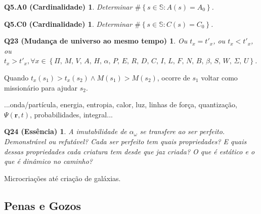 \documentclass[12pt,a4paper]{article}
\begin{document}
			\newtheorem{Q5.A0}{Q5.A0 (Cardinalidade)}
			\begin{Q5.A0} Determinar $ \#\left\{s \in \mathbb{S} : A(s) = A_0 \right\}$.
			\end{Q5.A0}

			\newtheorem{Q5.C0}{Q5.C0 (Cardinalidade)}
			\begin{Q5.C0} Determinar $ \#\left\{s \in \mathbb{S} : C(s) = C_0 \right\}$.
			\end{Q5.C0}

			\newtheorem{Q23}{Q23 (Mudan\c{c}a de universo ao mesmo tempo)}
			\begin{Q23} Ou $ t_x = t'_x $, ou $ t_x < t'_x $, ou $ t_x > t'_x, \forall x \in \left\{ \Pi, \, M, \, V, \, A, \, H, \, \alpha, \, P, \, E, \, R, \, D, \, C, \, I, \, L, \, F, \, N, \, B, \, \beta, \, S, \, W, \, \Sigma, \, U\right\}$.
			\end{Q23}

			Quando $t_x(s_1) > t_x(s_2) \wedge M(s_1) > M(s_2)$, ocorre de $s_1$ voltar como mission\'ario para ajudar $s_2$.

			...onda/part\'icula, energia, entropia, calor, luz, linhas de for\c{c}a, quantiza\c{c}\~ao, $ \Psi(\mathbf{r}, t) $, probabilidades, integral...

			\newtheorem{Q24}{Q24 (Ess\^encia)}
			\begin{Q24} A imutabilidade de $ \alpha_\omega $ se transfere ao ser perfeito. Demonstr\'avel ou refut\'avel? Cada ser perfeito tem quais propriedades? E quais dessas propriedades cada criatura tem desde que jaz criada? O que \'e est\'atico e o que \'e din\^amico no caminho?
			\end{Q24}

			Microcria\c{c}\~oes at\'e cria\c{c}\~ao de gal\'axias.

		\subsection{Penas e Gozos}
			\begin{flushright}
			\end{flushright}
\end{document}
